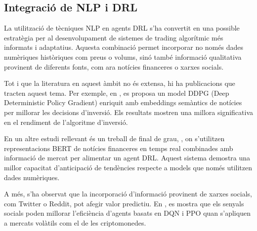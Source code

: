 \documentclass[12pt,a4paper,twoside]{book}
\begin{document}
\subsection{Integració de NLP i DRL}

La utilització de tècniques NLP en agents DRL s'ha convertit en una possible estratègia per al desenvolupament de sistemes de trading algorítmic més informats i adaptatius. Aquesta combinació permet incorporar no només dades numèriques històriques com preus o volums, sinó també informació qualitativa provinent de diferents fonts, com ara notícies financeres o xarxes socials.

Tot i que la literatura en aquest àmbit no és extensa, hi ha publicacions que tracten aquest tema. Per exemple, en \cite{gangopadhyay}, es proposa un model DDPG (Deep Deterministic Policy Gradient) enriquit amb embeddings semàntics de notícies per millorar les decisions d'inversió. Els resultats mostren una millora significativa en el rendiment de l'algoritme d'inversió.

En un altre estudi rellevant és un treball de final de grau, \cite{alvarez2023real}, on s'utilitzen representacions BERT de notícies financeres en temps real combinades amb informació de mercat per alimentar un agent DRL. Aquest sistema demostra una millor capacitat d'anticipació de tendències respecte a models que només utilitzen dades numèriques.

A més, s'ha observat que la incorporació d'informació provinent de xarxes socials, com Twitter o Reddit, pot afegir valor predictiu. En \cite{DBLP}, es mostra que els senyals socials poden millorar l'eficiència d'agents basats en DQN i PPO quan s'apliquen a mercats volàtils com el de les criptomonedes.
\end{document}
